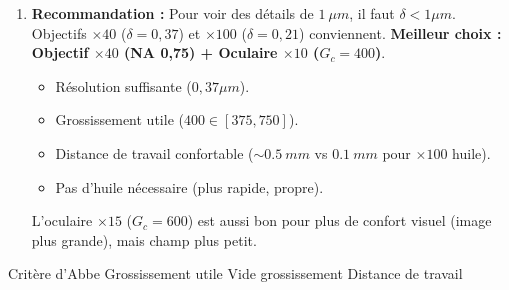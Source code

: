 \documentclass[11pt]{article}
\newcommand{\cle}[1]{{\popxbold\color{popdark}#1}}
\begin{document}
\begin{exoresolu}
\begin{enumerate}
\begin{itemize}
    \end{itemize}
    \item \textbf{Recommandation :} Pour voir des détails de $\SI{1}{\mu m}$, il faut $\delta < 1 \mu m$. Objectifs $\times 40$ ($\delta=0,37$) et $\times 100$ ($\delta=0,21$) conviennent.
    \textbf{Meilleur choix :} \textbf{Objectif $\times 40$ (NA 0,75) + Oculaire $\times 10$ ($G_c=400$)}.
    \begin{itemize}
        \item Résolution suffisante ($0,37 \mu m$).
        \item Grossissement utile ($400 \in [375, 750]$).
        \item Distance de travail confortable ($\sim \SI{0,5}{mm}$ vs $\SI{0,1}{mm}$ pour $\times 100$ huile).
        \item Pas d'huile nécessaire (plus rapide, propre).
    \end{itemize}
    L'oculaire $\times 15$ ($G_c=600$) est aussi bon pour plus de confort visuel (image plus grande), mais champ plus petit.
\end{enumerate}
\cle{Critère d'Abbe} \cle{Grossissement utile} \cle{Vide grossissement} \cle{Distance de travail}
\end{exoresolu}
\end{document}
